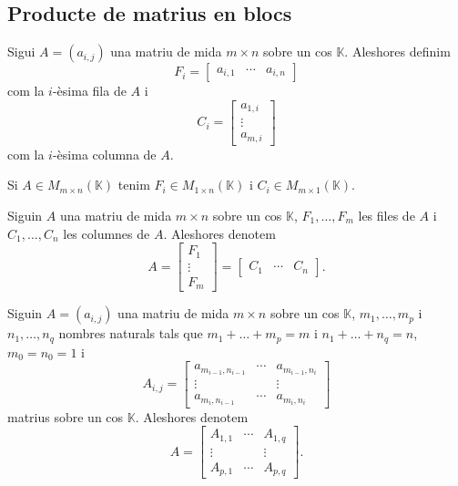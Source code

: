 \documentclass[../Apunts.tex]{subfiles}
\begin{document}
	\subsection{Producte de matrius en blocs}%
	\begin{definition}
		\label{def:fila d'una matriu}
		\label{def:columna d'una matriu}
		Sigui \(A=(a_{i,j})\) una matriu de mida \(m\times n\) sobre un cos \(\mathbb{K}\). Aleshores definim
		\[F_{i}=\left[\begin{matrix}
		a_{i,1} & \cdots & a_{i,n}
		\end{matrix}\right]\]
		com la \(i\)-èsima fila de \(A\) i
		\[C_{i}=\left[\begin{matrix}
		a_{1,i} \\
		\vdots \\
		a_{m,i}
		\end{matrix}\right]\]
		com la \(i\)-èsima columna de \(A\).
	\end{definition}
	\begin{observation}
		\label{obs:on pertanyen les files i les columnes d'una matriu}
		Si \(A\in M_{m\times n}(\mathbb{K})\) tenim \(F_{i}\in M_{1\times n}(\mathbb{K})\) i \(C_{i}\in M_{m\times 1}(\mathbb{K})\).
	\end{observation}
	\begin{notation}
		Siguin \(A\) una matriu de mida \(m\times n\) sobre un cos \(\mathbb{K}\), \(F_{1},\dots,F_{m}\) les files de \(A\) i \(C_{1},\dots,C_{n}\) les columnes de \(A\). Aleshores denotem
		\[A=\left[\begin{matrix}
		F_{1} \\
		\vdots \\
		F_{m}
		\end{matrix}\right]=\left[\begin{matrix}
		C_{1} & \cdots & C_{n}
		\end{matrix}\right].\]
	\end{notation}
	\begin{notation}
		Siguin \(A=(a_{i,j})\) una matriu de mida \(m\times n\) sobre un cos \(\mathbb{K}\), \(m_{1},\dots,m_{p}\) i \(n_{1},\dots,n_{q}\) nombres naturals tals que \(m_{1}+\dots+m_{p}=m\) i \(n_{1}+\dots+n_{q}=n\), \(m_{0}=n_{0}=1\) i
		\[A_{i,j}=\left[\begin{matrix}
		a_{m_{i-1},n_{i-1}} & \cdots & a_{m_{i-1},n_{i}}\\
		\vdots & & \vdots \\
		a_{m_{i},n_{i-1}} & \cdots & a_{m_{i},n_{i}}
		\end{matrix}\right]\]
		matrius sobre un cos \(\mathbb{K}\). Aleshores denotem
		\[A=\left[\begin{matrix}
		A_{1,1} & \cdots & A_{1,q} \\
		\vdots & & \vdots \\
		A_{p,1} & \cdots & A_{p,q}
		\end{matrix}\right].\]
	\end{notation}
\end{document}
